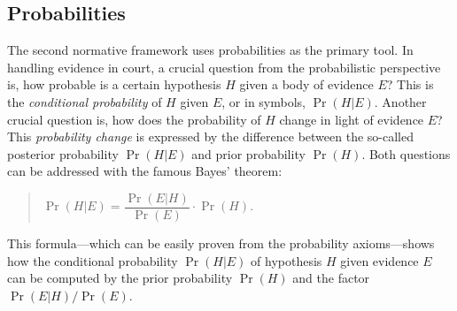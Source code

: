 \documentclass[10pt]{article}
\begin{document}
\subsection{Probabilities}
\label{sec:normfram:prob}
The second normative framework %
uses probabilities as the primary tool. 
In handling evidence in court, a crucial question from the probabilistic perspective is, 
how probable is a certain hypothesis $H$ given a body of evidence $E$? This is 
the \textit{conditional probability} of $H$ given $E$, or in symbols, $\Pr(H|E)$. 
Another crucial question is, how does the probability of $H$ 
change in light of evidence $E$? This \textit{probability change} is expressed by 
the difference between the so-called posterior probability $\Pr(H|E)$ and prior 
probability $\Pr(H)$.
Both questions can be addressed with 
the famous Bayes' theorem:
%
\begin{quotation}
	$\Pr(H|E) = \dfrac{\Pr(E|H)}{\Pr(E)}\cdot\Pr(H)$.
\end{quotation}
%
This formula---which can be easily proven from 
the probability axioms---shows how the 
conditional probability $\Pr(H|E)$ of hypothesis $H$ given evidence $E$ 
can be computed by the prior probability $\Pr(H)$ and the 
factor $\Pr(E|H)/\Pr(E)$. 
\end{document}
